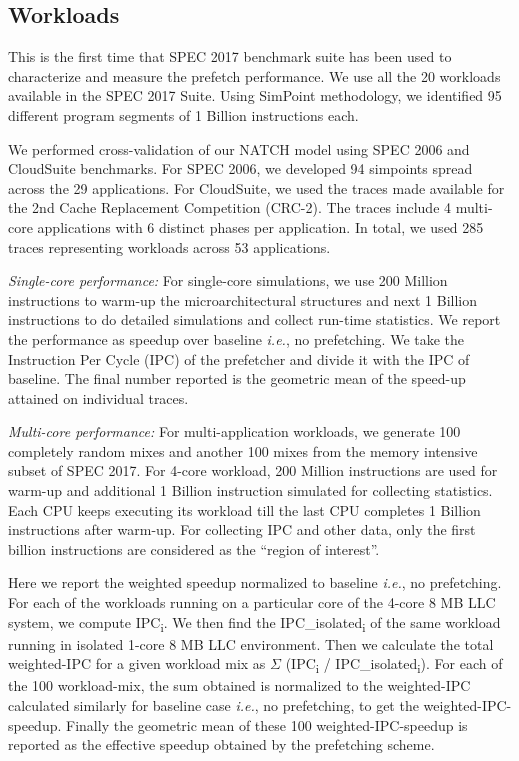 \subsection{Workloads}
\label{Method-Workloads}
This is the first time that SPEC 2017 benchmark suite\cite{SPEC2017}
has been used to characterize and measure the prefetch performance.
We use all the 20 workloads available in the SPEC 2017 Suite.  Using
SimPoint\cite{SimPoint} methodology, we identified 95 different
program segments of 1 Billion instructions each.

We performed cross-validation of our NATCH model using SPEC
2006\cite{SPEC2006} and CloudSuite\cite{CloudSuite} benchmarks.  For
SPEC 2006, we developed 94 simpoints spread across the 29
applications.  For CloudSuite, we used the traces made available for
the 2nd Cache Replacement Competition (CRC-2)\cite{CRC_2}.  The traces
include 4 multi-core applications with 6 distinct phases per
application.  In total, we used 285 traces representing workloads
across 53 applications.

\textit{Single-core performance:} For single-core simulations, we use
200 Million instructions to warm-up the microarchitectural structures
and next 1 Billion instructions to do detailed simulations and collect
run-time statistics.  We report the performance as speedup over
baseline \textit{i.e.}, no prefetching.  We take the Instruction Per
Cycle (IPC) of the prefetcher and divide it with the IPC of baseline.
The final number reported is the geometric mean of the speed-up
attained on individual traces.

\textit{Multi-core performance:} For multi-application workloads, we
generate 100 completely random mixes and another 100 mixes from the
memory intensive subset of SPEC 2017.  For 4-core workload, 200
Million instructions are used for warm-up and additional 1 Billion
instruction simulated for collecting statistics.  Each CPU keeps
executing its workload till the last CPU completes 1 Billion
instructions after warm-up.  For collecting IPC and other data, only
the first billion instructions are considered as the ``region of
interest''.

Here we report the weighted speedup normalized to baseline
\textit{i.e.}, no prefetching.  For each of the workloads running on a
particular core of the 4-core 8 MB LLC system, we compute
IPC\textsubscript{i}.  We then find the IPC\_isolated\textsubscript{i}
of the same workload running in isolated 1-core 8 MB LLC environment.
Then we calculate the total weighted-IPC for a given workload mix as
$\Sigma$ (IPC\textsubscript{i} / IPC\_isolated\textsubscript{i}).  For
each of the 100 workload-mix, the sum obtained is normalized to the
weighted-IPC calculated similarly for baseline case \textit{i.e.}, no
prefetching, to get the weighted-IPC-speedup.  Finally the geometric
mean of these 100 weighted-IPC-speedup is reported as the effective
speedup obtained by the prefetching scheme.

